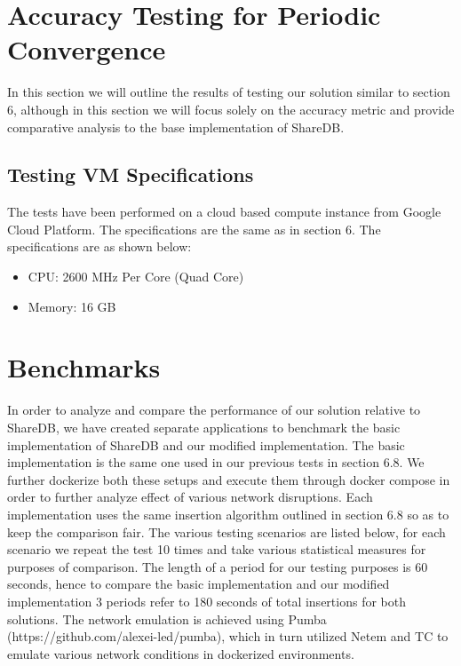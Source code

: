 \documentclass[9pt, titlepage]{article}
\begin{document}
  \break

  \section{Accuracy Testing for Periodic Convergence}
  In this section we will outline the results of testing our solution similar to section 6, although in this section we will focus
  solely on the accuracy metric and provide comparative analysis to the base implementation of ShareDB. 

  \subsection{Testing VM Specifications}
  The tests have been performed on a cloud based compute instance from Google Cloud Platform. The specifications are the same as in section 6.
  The specifications are as shown below:
  \begin{itemize}
    \item CPU: 2600 MHz Per Core (Quad Core)
    \item Memory: 16 GB
  \end{itemize}

  \section*{Benchmarks}
  In order to analyze and compare the performance of our solution relative to ShareDB, we have created separate applications to benchmark 
  the basic implementation of ShareDB and our modified implementation. The basic implementation is the same one used in our previous tests
  in section 6.8. We further dockerize both these setups and execute them through docker compose in order to further analyze effect of
  various network disruptions. Each implementation uses the same insertion algorithm outlined in section 6.8 so as to keep the comparison 
  fair. The various testing scenarios are listed below, for each scenario we repeat the test 10 times and take various statistical measures
  for purposes of comparison. The length of a period for our testing purposes is 60 seconds, hence to compare the basic implementation and
  our modified implementation 3 periods refer to 180 seconds of total insertions for both solutions. The network emulation is achieved using
  Pumba (https://github.com/alexei-led/pumba), which in turn utilized Netem and TC to emulate various network conditions in 
  dockerized environments.

  \break
\end{document}
